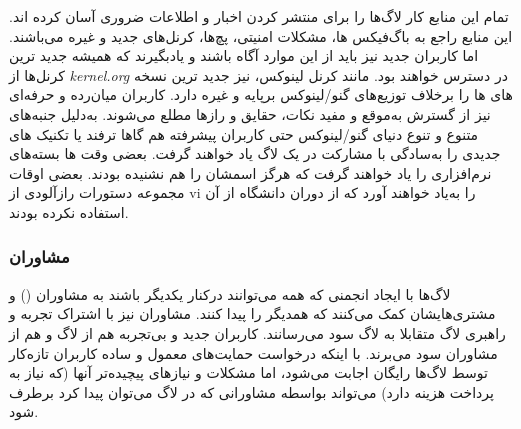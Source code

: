 تمام این منابع کار لاگ‌ها را برای منتشر کردن اخبار و اطلاعات
ضروری آسان کرده اند. این منابع راجع به باگ‌فیکس ها،
مشکلات امنیتی، پچ‌ها، کرنل‌های جدید و غیره می‌باشند.
اما کاربران جدید نیز باید از این موارد آگاه باشند
و یادبگیرند که همیشه جدید ترین کرنل‌ها از
\emph{kernel.org}
در دسترس خواهند بود. مانند کرنل لینوکس،
نیز جدید ترین نسخه های  ها را برخلاف
توزیع‌های گنو/لینوکس برپایه  و غیره دارد.
کاربران میان‌رده و حرفه‌ای نیز از گسترش به‌موقع و مفید
نکات، حقایق و رازها مطلع می‌شوند.
به‌دلیل جنبه‌های متنوع و تنوع دنیای گنو/لینوکس حتی
کاربران پیشرفته هم گاها ترفند یا تکنیک های جدیدی را
به‌سادگی با مشارکت در یک لاگ یاد خواهند گرفت.
بعضی وقت ها بسته‌های نرم‌افزاری را یاد خواهند گرفت که
هرگز اسمشان را هم نشنیده بودند. بعضی اوقات مجموعه دستورات
رازآلودی از {\ttfamily vi} را به‌یاد خواهند آورد که از دوران
دانشگاه از آن استفاده نکرده بودند.

\subsubsection{مشاوران }

لاگ‌ها با ایجاد انجمنی که همه می‌توانند درکنار یکدیگر باشند
به مشاوران
()
 و مشتری‌هایشان کمک می‌کنند که همدیگر را پیدا کنند.
مشاوران نیز با اشتراک تجربه و راهبری لاگ‌ متقابلا به لاگ سود می‌رسانند.
کاربران جدید و بی‌تجربه هم از لاگ و هم از مشاوران سود می‌برند.
با اینکه درخواست حمایت‌های معمول و ساده کاربران تازه‌کار توسط لاگ‌ها
رایگان اجابت می‌شود، اما مشکلات و نیازهای پیچیده‌تر آنها (که نیاز
به پرداخت هزینه دارد) می‌تواند بواسطه مشاورانی که در لاگ می‌توان پیدا
کرد برطرف شود.

